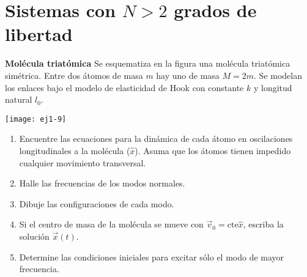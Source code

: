 \section*{Sistemas con \(N> 2\) grados de libertad}


\item
\begin{minipage}[t][2.6cm]{0.75\textwidth}
\textbf{Molécula triatómica}
Se esquematiza en la figura una molécula triatómica simétrica.
Entre dos átomos de masa $m$ hay uno de masa $M = 2 m$.
Se modelan los enlaces bajo el modelo de elasticidad de Hook con constante $k$ y longitud natural $l_0$.
\end{minipage}
\begin{minipage}[c][0cm][t]{0.2\textwidth}
  \texttt{[image: ej1-9]}
\end{minipage}
\begin{enumerate}
	\item Encuentre las ecuaciones para la dinámica de cada átomo en oscilaciones longitudinales a la molécula (\(\hat{x}\)).
	Asuma que los átomos tienen impedido cualquier movimiento transversal.
	\item Halle las frecuencias de los modos normales. 
	\item Dibuje las configuraciones de cada modo. 
	\item Si el centro de masa de la molécula se mueve con $\vec{v}_0 = \mathrm{cte} \hat{x}$, escriba la solución $\vec{x}(t)$.
	\item Determine las condiciones iniciales para excitar sólo el modo de mayor frecuencia.
\end{enumerate}




